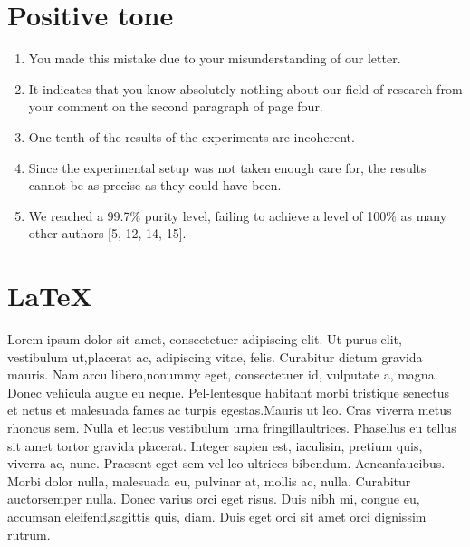 \documentclass[paper=a4, fontsize=11pt]{scrartcl} %
\numberwithin{equation}{section} %
\numberwithin{figure}{section} %
\numberwithin{table}{section} %
\begin{document}
\section{Positive tone}
	\begin{enumerate}
		\item 
			You made this mistake due to your misunderstanding of our letter.
		\item 
			It indicates that you know absolutely nothing about our ﬁeld of research from your comment on the second paragraph of page four.
		\item
			 One-tenth of the results of the experiments are incoherent.
		\item
			 Since the experimental setup was not taken enough care for, the results cannot be as precise as they could have been.
		\item
			 We reached a 99.7\% purity level, failing to achieve a level of 100\% as many other authors [5, 12, 14, 15].
	\end{enumerate}

\section{\LaTeX}
	Lorem\citep{RN5}  ipsum  dolor\citep{RN11}  sit  amet,  consectetuer  adipiscing  elit.   Ut  purus  elit,  vestibulum  ut,placerat  ac,  adipiscing  vitae,  felis.   Curabitur  dictum  gravida  mauris.   Nam  arcu  libero,nonummy eget, consectetuer id, vulputate a, magna.  Donec vehicula augue eu neque.  Pel-lentesque habitant morbi tristique senectus et netus et malesuada fames ac turpis egestas.Mauris ut leo.  Cras viverra metus rhoncus sem.  Nulla et lectus vestibulum urna fringillaultrices.   Phasellus\citep{RN14}  eu  tellus  sit  amet  tortor  gravida  placerat.   Integer  sapien  est,  iaculisin,  pretium  quis,  viverra  ac,  nunc.   Praesent  eget  sem  vel  leo  ultrices  bibendum.   Aeneanfaucibus.  Morbi dolor nulla, malesuada eu, pulvinar at, mollis ac, nulla.  Curabitur\citep{RN10} auctorsemper  nulla.   Donec  varius  orci  eget  risus.   Duis  nibh  mi,  congue  eu,  accumsan  eleifend,sagittis quis, diam.  Duis eget orci sit amet orci dignissim rutrum.
\end{document}
